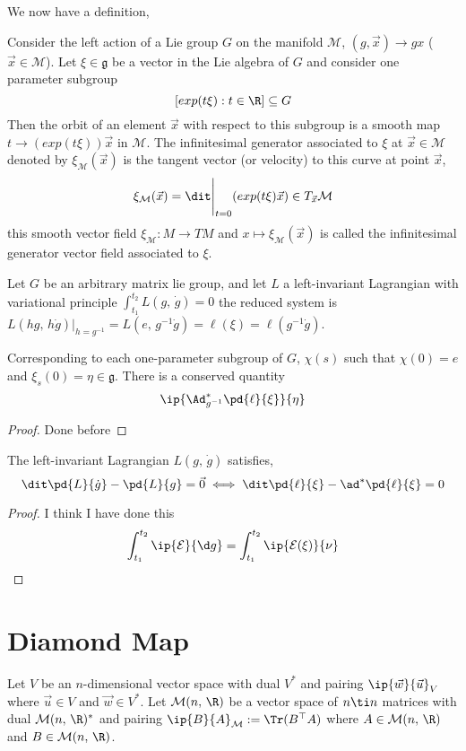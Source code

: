 We now have a definition,
\begin{ndefi}
  Consider the left action of a Lie group $G$ on the manifold $\mathcal{M}$, $(g, \vec x) \to gx$ ($\vec x \in \mathcal{M}$). Let $\xi \in \mathfrak{g}$ be a vector in the Lie algebra of $G$ and consider one parameter subgroup $$[exp(t\xi) : t \in \R] \subseteq G$$
  Then the orbit of an element $\vec x$ with respect to this subgroup is a smooth map $t \to (exp(t\xi))\vec x$ in $\mathcal{M}$. The infinitesimal generator associated to $\xi$ at $\vec x \in \mathcal{M}$ denoted by $\xi_{\mathcal{M}}(\vec x)$ is the tangent vector (or velocity) to this curve at point $\vec x$,
  $$ \xi_{\mathcal{M}} (\vec x) = \dit\Bigg|_{t=0} (exp(t \xi)\vec x) \in T_{\vec x}\mathcal{M} $$
  this smooth vector field $\xi_{\mathcal{M}} : M \to TM$ and $x \mapsto \xi_{\mathcal{M}}(\vec x)$ is called the infinitesimal generator vector field associated to $\xi$.
\end{ndefi}

Let $G$ be an arbitrary matrix lie group, and let $L$ a left-invariant Lagrangian with variational principle $\int_{t_1}^{t_2} L(g,\,\dot g) = 0$ the reduced system is $L(hg,\, h\dot g)|_{h = g^{-1}} = L(e,\,g^{-1}\dot g) = \ell(\xi) = \ell(g^{-1}\dot g)$.
\begin{nthm}
  Corresponding to each one-parameter subgroup of $G$, $\chi(s)$ such that $\chi(0) = e$ and $\xi_s(0) = \eta \in \mathfrak{g}$. There is a conserved quantity
  $$ \ip{\Ad^*_{g^{-1}} \pd{\ell}{\xi}}{\eta} $$
\end{nthm}
\begin{proof}
  Done before
\end{proof}

\begin{nprop}
  The left-invariant Lagrangian $L(g,\,\dot g)$ satisfies,
  $$ \dit\pd{L}{\dot g} - \pd{L}{g} = \vec 0  \iff \dit\pd{\ell}{\xi} - \ad^*\pd{\ell}{\xi} = 0$$
\end{nprop}
\begin{proof}
  I think I have done this
  $$ \int_{t_1}^{t_2} \ip{\mathcal{E}}{\d g} = \int_{t_1}^{t_2} \ip{\mathcal{E}(\xi)}{\nu} $$
\end{proof}

\section{Diamond Map}
Let $V$ be an $n$-dimensional vector space with dual $V^*$ and pairing $\ip{\vec w}{\vec u}_V$ where $\vec u \in V$ and $\vec w \in V^*$. Let $\mathcal{M}(n,\,\R)$ be a vector space of $n \ti n$ matrices with dual $\mathcal{M}(n,\,\R)^*$ and pairing $\ip{B}{A}_{\mathcal{M}} := \Tr(B^\top A)$ where $A \in \mathcal{M}(n,\,\R)$ and $B \in \mathcal{M}(n,\,\R)$.\\

